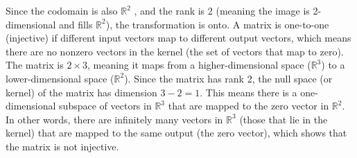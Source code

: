 \documentclass{report}
\begin{document}
\begin{itemize}
\begin{itemize}
                \bigbreak \noindent 
                Since the codomain is also $\mathbb{R}^{2} $ , and the rank is 2 (meaning the image is 2-dimensional and fills $\mathbb{R}^{2}$), the transformation is onto.
                \bigbreak \noindent 
                A matrix is one-to-one (injective) if different input vectors map to different output vectors, which means there are no nonzero vectors in the kernel (the set of vectors that map to zero).
                \bigbreak \noindent 
                The matrix is \( 2 \times 3 \), meaning it maps from a higher-dimensional space (\(\mathbb{R}^3\)) to a lower-dimensional space (\(\mathbb{R}^2\)).
                \bigbreak \noindent 
                Since the matrix has rank 2, the null space (or kernel) of the matrix has dimension \( 3 - 2 = 1 \). This means there is a one-dimensional subspace of vectors in \(\mathbb{R}^3\) that are mapped to the zero vector in \(\mathbb{R}^2\).
                \bigbreak \noindent 
                In other words, there are infinitely many vectors in \(\mathbb{R}^3\) (those that lie in the kernel) that are mapped to the same output (the zero vector), which shows that the matrix is not injective.

        \end{itemize}








    \end{itemize}


    \pagebreak 
\end{document}
